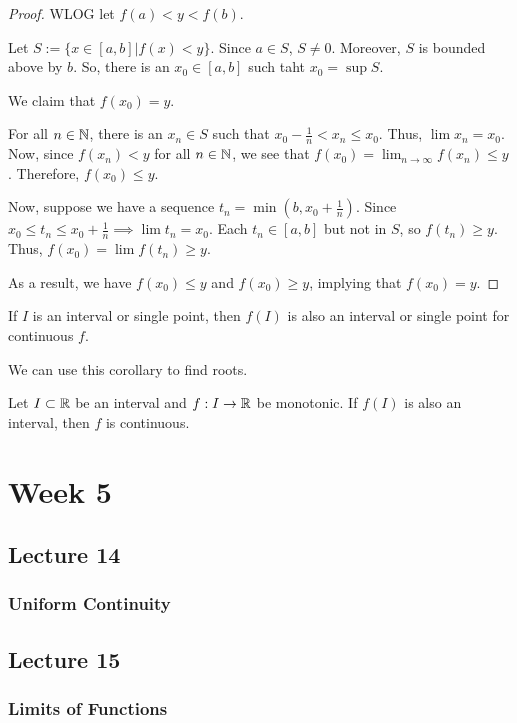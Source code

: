 \documentclass{book}
\begin{document}
\begin{proof}
    WLOG let $f(a) < y < f(b)$. 

    Let $S := \{x \in [a, b] | f(x) < y\}$. Since $a \in S$, $S \neq 0$. Moreover, $S$ is bounded above by $b$. So, there is an $x_0 \in [a, b]$ such taht $x_0 = \sup S$.

    We claim that $f(x_0) = y$.

    For all $n \in \mathbb{N}$, there is an $x_n \in S$ such that $x_0 - \frac{1}{n} < x_n \leq x_0$. Thus, $\lim x_n = x_0$. Now, since $f(x_n) < y$ for all $n \in \mathbb{N}$, we see that $f(x_0) = \lim_{n \to \infty} f(x_n) \leq y$. Therefore, $f(x_0) \leq y$. 

    Now, suppose we have a sequence $t_n = \min(b, x_0 + \frac{1}{n})$. Since $x_0 \leq t_n \leq x_0 + \frac{1}{n} \implies \lim t_n = x_0$. Each $t_n \in [a, b]$ but not in $S$, so $f(t_n) \geq y$. Thus, $f(x_0) = \lim f(t_n) \geq y$.

    As a result, we have $f(x_0) \leq y$ and $f(x_0) \geq y$, implying that $f(x_0) = y$.
\end{proof}

\begin{corollary}
    If $I$ is an interval or single point, then $f(I)$ is also an interval or single point for continuous $f$.
\end{corollary}

We can use this corollary to find roots.

\begin{thm}
    Let $I \subset \mathbb{R}$ be an interval and $f: I \to \mathbb{R}$ be monotonic. If $f(I)$ is also an interval, then $f$ is continuous.
\end{thm}
\chapter{Week 5}
\section{Lecture 14}
\subsection{Uniform Continuity}
\section{Lecture 15}
\subsection{Limits of Functions}
\end{document}
